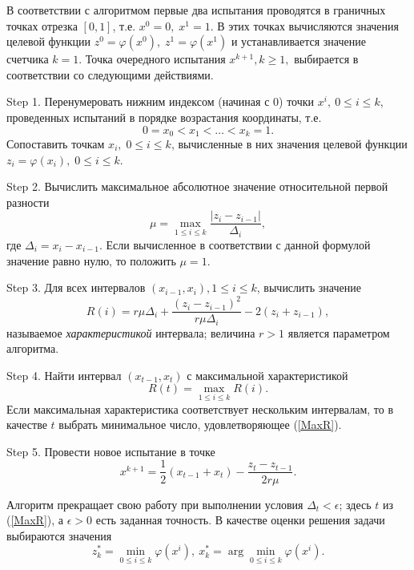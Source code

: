\documentclass[entropy,article,submit,moreauthors,pdftex]{Definitions/mdpi}
\begin{document}
В соответствии с алгоритмом первые два испытания проводятся в граничных точках отрезка $[0,1]$, т.е. $x^0=0,\;x^1=1$. 
В этих точках вычисляются значения целевой функции $z^0=\varphi(x^0),\;z^1=\varphi(x^1)$ и устанавливается значение счетчика $k=1$. 
Точка очередного испытания $x^{k+1}, k\geq 1,$ выбирается в соответствии со следующими действиями.

 Step 1. Перенумеровать нижним индексом (начиная с 0) точки $x^i,\:0\leq i\leq k$, проведенных испытаний в порядке возрастания координаты, т.е.
\begin{equation}\label{xt}
0=x_0<x_1<\ldots <x_{k}=1.
\end{equation} 
Сопоставить точкам $x_i, \; 0\leq i\leq k$, вычисленные в них значения целевой функции $z_i=\varphi(x_i), \; 0\leq i\leq k$.

Step 2. Вычислить максимальное абсолютное значение относительной первой разности
\begin{equation}\label{mu}
\mu=\max_{1\leq i\leq k}\frac{\left|z_i-z_{i-1}\right|}{\Delta_i},
\end{equation}
где $\Delta_i = x_i-x_{i-1}$. Если вычисленное в соответствии с данной формулой значение равно нулю, то положить $\mu = 1$.

Step 3. Для всех интервалов $(x_{i-1},x_i),1\leq i\leq k$,  вычислить значение
\begin{equation}\label{R}
R(i)=r\mu\Delta_i+\frac{(z_i-z_{i-1})^2}{r\mu\Delta_i}-2(z_i+z_{i-1}),
\end{equation} 
называемое \textit{характеристикой} интервала; величина $r>1$ является параметром алгоритма. 

Step 4. Найти интервал $(x_{t-1},x_t)$ с максимальной характеристикой
\begin{equation}\label{MaxR}
R(t)=\max_{1\leq i\leq {k}}R(i).
\end{equation}
Если максимальная характеристика соответствует нескольким интервалам, то в качестве $t$ выбрать минимальное число, удовлетворяющее (\ref{MaxR}).

Step 5. Провести новое испытание в точке
\begin{equation}\label{xk1}
x^{k+1}=\frac{1}{2}(x_{t-1}+x_t) - \frac{z_t-z_{t-1}}{2r\mu}.
\end{equation}

Алгоритм прекращает свою работу при выполнении условия $\Delta_t<\epsilon$; здесь $t$ из (\ref{MaxR}), а $\epsilon>0$ есть заданная точность. 
В качестве оценки решения задачи выбираются значения 
\[
z_k^\ast=\min_{0\leq i \leq k}\varphi(x^i), \ x_k^\ast=\arg \min_{0\leq i \leq
 k}\varphi(x^i).
\] 
\end{document}
